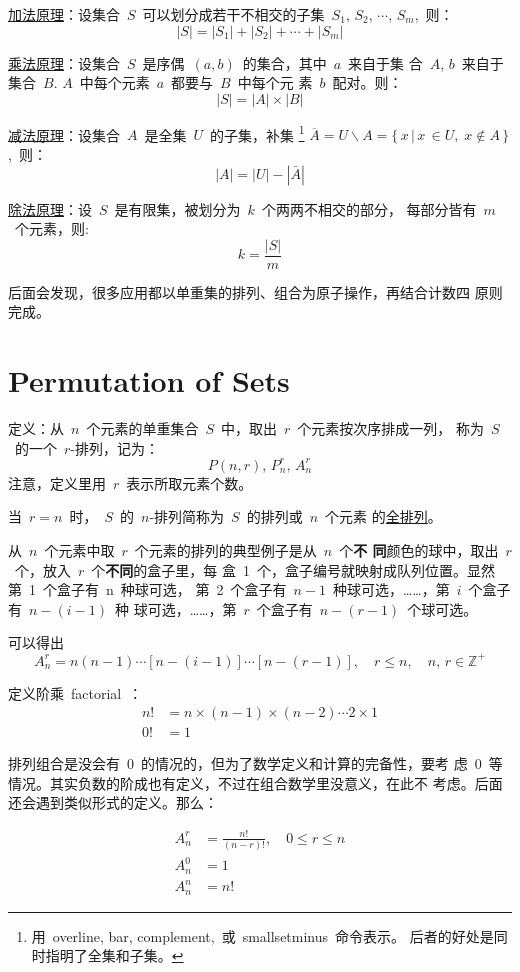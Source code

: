 \uline{加法原理}：设集合~$S$~可以划分成若干不相交的子集~$S_1,\, S_2,\,
\cdots,\, S_m$,~则：
\[ |S| = |S_1| + |S_2| + \cdots + |S_m| \]

\uline{乘法原理}：设集合~$S$~是序偶~$(a, b)$~的集合，其中~$a$~来自于集
合~$A$, $b$~来自于集合~$B$. $A$~中每个元素~$a$~都要与~$B$~中每个元
素~$b$~配对。则：
\[ |S| = |A| \times |B| \]

\uline{减法原理}：设集合~$A$~是全集~$U$~的子集，补集
\footnote{用~overline, bar, complement,~或~smallsetminus~命令表示。
  后者的好处是同时指明了全集和子集。}\;
$\overline{A} = U \smallsetminus A = \{\, x\, |\, x\, \in U,\; x
\notin A \,\}$,~则：
\[ |A| = |U| - |\bar{A}| \]

\uline{除法原理}：设~$S$~是有限集，被划分为~$k$~个两两不相交的部分，
每部分皆有~$m$~个元素，则:
\[ k = \frac{|S|}{m} \]

后面会发现，很多应用都以单重集的排列、组合为原子操作，再结合计数四
原则完成。

\section{Permutation of Sets}
\label{sec:permutation-sets}

定义：从~$n$~个元素的单重集合~$S$~中，取出~$r$~个元素按次序排成一列，
称为~$S$~的一个~$r$-排列，记为：
\[ P(n,r),\, P_n^r,\, A_n^r \]
注意，定义里用~$r$~表示所取元素个数。

当~$r = n$~时，~$S$~的~$n$-排列简称为~$S$~的排列或~$n$~个元素
的\uline{全排列}。

从~$n$~个元素中取~$r$~个元素的排列的典型例子是从~$n$~个\textbf{不
  同}颜色的球中，取出~$r$~个，放入~$r$~个\textbf{不同}的盒子里，每
盒~1~个，盒子编号就映射成队列位置。显然第~1~个盒子有~n~种球可选，
第~2~个盒子有~$n-1$~种球可选，……，第~$i$~个盒子有~$n - (i - 1)$~种
球可选，……，第~$r$~个盒子有~$n - (r - 1)$~个球可选。

可以得出
\[ A_n^r = n(n - 1)\cdots[n - (i - 1)]\cdots[n - (r - 1)],\quad r \leq n,\quad n,\, r \in \mathbb{Z}^+ \]

定义阶乘~factorial~：
\begin{align*}
  n! &= n\times(n - 1)\times(n - 2)\cdots2\times1 \\
  0! &= 1
\end{align*}

排列组合是没会有~0~的情况的，但为了数学定义和计算的完备性，要考
虑~0~等情况。其实负数的阶成也有定义，不过在组合数学里没意义，在此不
考虑。后面还会遇到类似形式的定义。那么：

\begin{align*}
  A_n^r &= \frac{n!}{(n - r)!}, \quad 0 \leq r \leq n \\
  A_n^0 &= 1 \\
  A_n^n &= n!
\end{align*}

